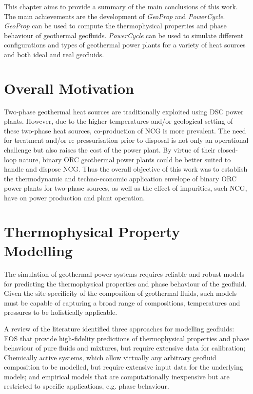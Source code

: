 This chapter aims to provide a summary of the main conclusions of this work. The main achievements are the development of \emph{GeoProp} and \emph{PowerCycle}. \emph{GeoProp} can be used to compute the thermophysical properties and phase behaviour of geothermal geofluids. \emph{PowerCycle} can be used to simulate different configurations and types of geothermal power plants for a variety of heat sources and both ideal and real geofluids.

\section{Overall Motivation}
    Two-phase geothermal heat sources are traditionally exploited using \ac{DSC} power plants. However, due to the higher temperatures and/or geological setting of these two-phase heat sources, co-production of \ac{NCG} is more prevalent. The need for treatment and/or re-pressurisation prior to disposal is not only an operational challenge but also raises the cost of the power plant. By virtue of their closed-loop nature, binary \ac{ORC} geothermal power plants could be better suited to handle and dispose \ac{NCG}. Thus the overall objective of this work was to establish the thermodynamic and techno-economic application envelope of binary \ac{ORC} power plants for two-phase sources, as well as the effect of impurities, such \ac{NCG}, have on power production and plant operation.

\section{Thermophysical Property Modelling}
    The simulation of geothermal power systems requires reliable and robust models for predicting the thermophysical properties and phase behaviour of the geofluid. Given the site-specificity of the composition of geothermal fluids, such models must be capable of capturing a broad range of compositions, temperatures and pressures to be holistically applicable.

    A review of the literature identified three approaches for modelling geofluids: \ac{EOS} that provide high-fidelity predictions of thermophysical properties and phase behaviour of pure fluids and mixtures, but require extensive data for calibration; Chemically active systems, which allow virtually any arbitrary geofluid composition to be modelled, but require extensive input data for the underlying models; and empirical models that are computationally inexpensive but are restricted to specific applications, e.g. phase behaviour.

